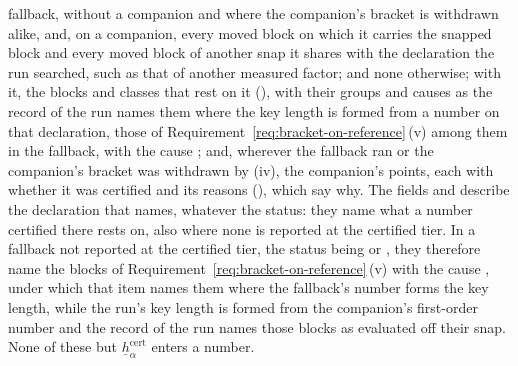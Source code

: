 \begin{requirement}
\begin{enumerate}[label=(\roman*),leftmargin=2.4em]
  fallback, without a companion and where the companion's bracket is
  withdrawn alike, and, on a companion, every moved block on which it carries
  the snapped block and every moved block of another snap it shares with the
  declaration the run searched, such as that of another measured factor;
  and none otherwise; with it, the blocks and classes that
  rest on it (), with their groups and causes as the
  record of the run names them where the key length is formed from a number
  on that declaration, those of
  Requirement~\ref{req:bracket-on-reference}\,(v) among them in the
  fallback, with the cause ; and, wherever
  the fallback ran or the companion's bracket was withdrawn by (iv), the
  companion's points, each with whether it was certified and its reasons
  (), which say why. The fields 
  and  describe the declaration that
   names, whatever the status: they name what a number
  certified there rests on, also where none is reported at the certified
  tier. In a fallback not reported at the certified tier, the status being
   or , they therefore name the blocks
  of Requirement~\ref{req:bracket-on-reference}\,(v) with the cause
  , under which that item names them where
  the fallback's number forms the key length, while the run's key length is
  formed from the companion's first-order number and the record of the run
  names those blocks as evaluated off their snap. None of these but
  $\underline{h}^{\mathrm{cert}}_{\alpha}$ enters a number.
\end{enumerate}
\end{requirement}
